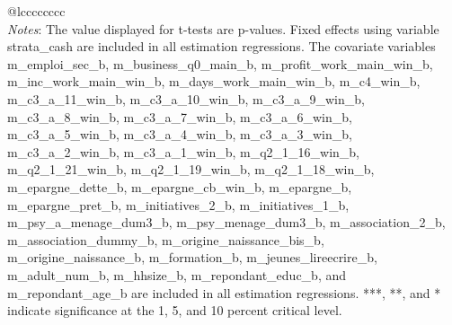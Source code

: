 \begin{tabular}{@{\extracolsep{5pt}}lcccccccc}
\hline \hline \\[-1.8ex]
{\textit{Notes}:  The value displayed for t-tests are p-values. Fixed effects using variable strata\_cash are included in all estimation regressions. The covariate variables m\_emploi\_sec\_b, m\_business\_q0\_main\_b, m\_profit\_work\_main\_win\_b, m\_inc\_work\_main\_win\_b, m\_days\_work\_main\_win\_b, m\_c4\_win\_b, m\_c3\_a\_11\_win\_b, m\_c3\_a\_10\_win\_b, m\_c3\_a\_9\_win\_b, m\_c3\_a\_8\_win\_b, m\_c3\_a\_7\_win\_b, m\_c3\_a\_6\_win\_b, m\_c3\_a\_5\_win\_b, m\_c3\_a\_4\_win\_b, m\_c3\_a\_3\_win\_b, m\_c3\_a\_2\_win\_b, m\_c3\_a\_1\_win\_b, m\_q2\_1\_16\_win\_b, m\_q2\_1\_21\_win\_b, m\_q2\_1\_19\_win\_b, m\_q2\_1\_18\_win\_b, m\_epargne\_dette\_b, m\_epargne\_cb\_win\_b, m\_epargne\_b, m\_epargne\_pret\_b, m\_initiatives\_2\_b, m\_initiatives\_1\_b, m\_psy\_a\_menage\_dum3\_b, m\_psy\_menage\_dum3\_b, m\_association\_2\_b, m\_association\_dummy\_b, m\_origine\_naissance\_bis\_b, m\_origine\_naissance\_b, m\_formation\_b, m\_jeunes\_lireecrire\_b, m\_adult\_num\_b, m\_hhsize\_b, m\_repondant\_educ\_b, and m\_repondant\_age\_b are included in all estimation regressions. ***, **, and * indicate significance at the 1, 5, and 10 percent critical level. }
\end{tabular}
